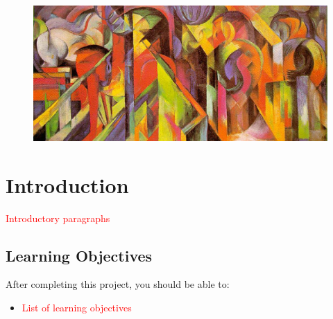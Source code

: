 




\noindent {}

\quad

\begin{figure}[h]
	\centering
	\includegraphics[height=0.4\textwidth]{figures/stables.jpg} %
\end{figure}

\section*{Introduction}

\textcolor{red}{Introductory paragraphs}

\subsection*{Learning Objectives}

After completing this project, you should be able to:
\begin{itemize}
	\item \textcolor{red}{List of learning objectives}
\end{itemize}



